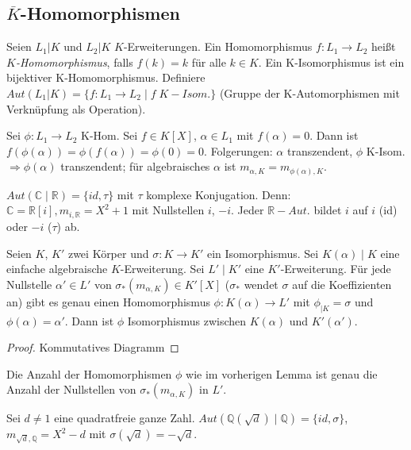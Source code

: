 \documentclass[../main.tex]{subfiles}
\begin{document}
\subsection{$\overline{K}$-Homomorphismen}
\begin{definition}
    Seien $L_1| K$ und $L_2|K$ $K$-Erweiterungen. Ein Homomorphismus $f: L_1 \rightarrow L_2$ heißt \emph{$K$-Homomorphismus}, falls $f(k) = k$ für alle $k \in K$. Ein K-Isomorphismus ist ein bijektiver K-Homomorphismus. Definiere ${Aut}(L_1|K) = \{f: L_1 \rightarrow L_2 \mid f \; K-Isom.\}$ (Gruppe der K-Automorphismen mit Verknüpfung als Operation).
\end{definition}
\begin{remark}[Beobachtung]
    Sei $\phi: L_1 \rightarrow L_2$ K-Hom. Sei $f \in K[X]$, $\alpha \in L_1$ mit $f(\alpha) = 0$. Dann ist $f(\phi(\alpha)) = \phi(f(\alpha)) = \phi(0) = 0$. 
    Folgerungen: $\alpha$ transzendent, $\phi$ K-Isom. $\Rightarrow \phi(\alpha)$ transzendent; für algebraisches $\alpha$ ist $m_{\alpha, K} = m_{\phi(\alpha), K}$.
\end{remark}
\begin{example*}
    $Aut(\mathbb{C}\mid\mathbb{R}) = \{id, \tau\}$ mit $\tau$ komplexe Konjugation. Denn: $\mathbb{C} = \mathbb{R}[i], m_{i, \mathbb{R}} = X^2 + 1$ mit Nullstellen $i$, $-i$. Jeder $\mathbb{R}-Aut.$ bildet $i$ auf $i$ (id) oder $-i$ ($\tau$) ab.
\end{example*}
\begin{lemma} \label{theo:2.28}
    Seien $K$, $K'$ zwei Körper und $\sigma: K \rightarrow K'$ ein Isomorphismus. Sei $K(\alpha) \mid K$ eine einfache algebraische $K$-Erweiterung. Sei $L' \mid K'$ eine $K'$-Erweiterung. Für jede Nullstelle $\alpha' \in L'$ von $\sigma_*(m_{\alpha, K}) \in K'[X]$ ($\sigma_*$ wendet $\sigma$ auf die Koeffizienten an) gibt es genau einen Homomorphismus $\phi: K(\alpha) \rightarrow L'$ mit $\phi_{|K} = \sigma$ und $\phi(\alpha) = \alpha'$. Dann ist $\phi$ Isomorphismus zwischen $K(\alpha)$ und $K'(\alpha')$.
\end{lemma}
\begin{proof}
    Kommutatives Diagramm
\end{proof}
\begin{remark}
    Die Anzahl der Homomorphismen $\phi$ wie im vorherigen Lemma ist genau die Anzahl der Nullstellen von $\sigma_*(m_{\alpha, K})$ in $L'$.
\end{remark}
\begin{example}
    Sei $d \neq 1$ eine quadratfreie ganze Zahl. $Aut(\mathbb{Q}(\sqrt{d}) \mid \mathbb{Q}) = \{id, \sigma\}$, $m_{\sqrt{d},\mathbb{Q}} = X^2 - d$ mit $\sigma(\sqrt{d}) = -\sqrt{d}$.
\end{example}
\end{document}
